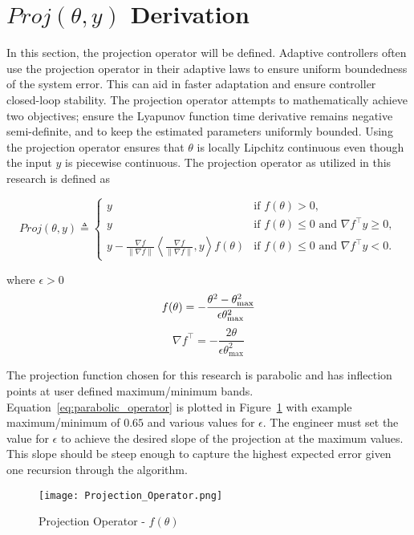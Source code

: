 \label{appendix:projection_derivation}
\section{$Proj(\theta,y)$ Derivation}

In this section, the projection operator will be defined.  Adaptive controllers often use the projection operator in their adaptive laws to ensure uniform boundedness of the system error.  This can aid in faster adaptation and ensure controller closed-loop stability.  The projection operator attempts to mathematically achieve two objectives; ensure the Lyapunov function time derivative remains negative semi-definite, and to keep the estimated parameters uniformly bounded.  Using the projection operator ensures that $\theta$ is locally Lipchitz continuous even though the input $y$ is piecewise continuous.  The projection operator as utilized in this research is defined as

\begin{equation}
Proj(\theta,y)\triangleq 	
	\begin{cases}
	y& \text{if }f(\theta)>0, \\
	y& \text{if }f(\theta) \leq 0\text{ and }\nabla f^\top y\geq 0,\\
	y-\frac{\nabla f}{\|\nabla f\|}\left\langle\frac{\nabla f}{\|\nabla f\|},y\right\rangle f(\theta)& \text{if }f(\theta)\leq 0\text{ and }\nabla f^\top y< 0.
	\end{cases}	
\end{equation}

where $\epsilon>0$
\begin{equation}\label{eq:parabolic_operator}
	f(\theta)=-\frac{\theta^2-\theta_{\text{max}}^2}{\epsilon \theta_{\text{max}}^2}\\
\end{equation}
\begin{equation}
	\nabla f^\top=-\frac{2\theta}{\epsilon \theta_{\text{max}}^2}
\end{equation}

The projection function chosen for this research is parabolic and has inflection points at user defined maximum/minimum bands.  Equation~\ref{eq:parabolic_operator} is plotted in Figure~\ref{fig:projection_operator} with example maximum/minimum of $0.65$ and various values for $\epsilon$.  The engineer must set the value for $\epsilon$ to achieve the desired slope of the projection at the maximum values.  This slope should be steep enough to capture the highest expected error given one recursion through the algorithm.
\begin{figure}[h!]
 \centering
  \texttt{[image: Projection\_Operator.png]}
  \caption{Projection Operator - $f(\theta)$}
  \label{fig:projection_operator}
\end{figure}

